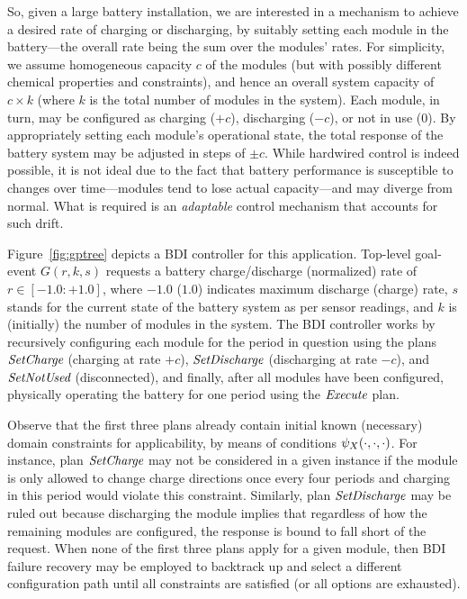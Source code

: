 So, given a large battery installation, we are interested in a mechanism to achieve a desired rate of charging or discharging, by suitably setting each module in the battery---the overall rate being the sum over the modules' rates.  
For simplicity, we assume homogeneous capacity $c$ of the modules (but with possibly different chemical properties and constraints), and hence an overall system capacity of $c \times k$ (where $k$ is the total number of modules in the system). Each module, in turn, may be configured as charging ($+c$), discharging ($-c$), or not in use ($0$). By appropriately setting each module's operational state, the total response of the battery system may be adjusted in steps of $\pm c$.
While hardwired control is indeed possible, it is not ideal due to the fact that battery performance is susceptible to changes over time---modules tend to lose actual capacity---and may diverge from normal. 
What is required is an \emph{adaptable} control mechanism that accounts for such drift. 

Figure~\ref{fig:gptree} depicts a BDI controller for this application. Top-level goal-event $G(r,k,s)$ requests a battery charge/discharge (normalized) rate of $r \in [-1.0:+1.0]$, where $-1.0$ ($1.0$) indicates maximum discharge (charge) rate, $s$ stands for the current state of the battery system as per sensor readings, and $k$ is (initially) the number of modules in the system. 
The BDI controller works by recursively configuring each module for the period in question using the plans $\operatorname{\textit{SetCharge}}$ (charging at rate $+c$), $\operatorname{\textit{SetDischarge}}$ (discharging at rate $-c$), and $\operatorname{\textit{SetNotUsed}}$ (disconnected), and finally, after all modules have been configured, physically operating the battery for one period using the $\operatorname{\textit{Execute}}$ plan. 

Observe that the first three plans already contain initial known (necessary) domain constraints for applicability, by means of conditions $\psi_X(\cdot,\cdot,\cdot)$. For instance, plan $\operatorname{\textit{SetCharge}}$ may not be considered in a given instance if the module is only allowed to change charge directions once every four periods and charging in this period would violate this constraint. 
Similarly, plan $\operatorname{\textit{SetDischarge}}$ may be ruled out because discharging the module implies that regardless of how the remaining modules are configured, the response is bound to fall short of the request.
When none of the first three plans apply for a given module, then BDI failure recovery may be employed to backtrack up and select a different configuration path until all constraints are satisfied (or all options are exhausted). 


